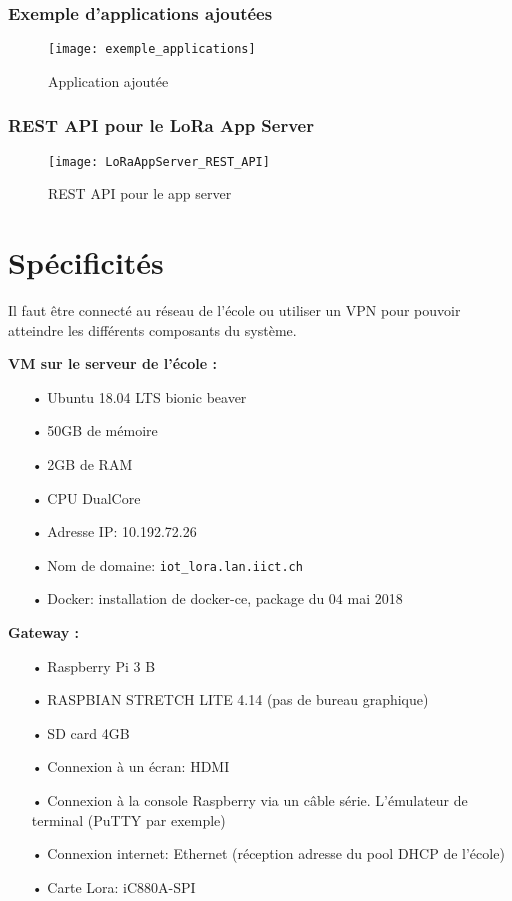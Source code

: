 \subsubsection{Exemple d'applications ajoutées}

\begin{figure}[h!]
\centering
\texttt{[image: exemple\_applications]}
\caption{Application ajoutée}
\end{figure}

\subsubsection{REST API pour le LoRa App Server}

\begin{figure}[h!]
\texttt{[image: LoRaAppServer\_REST\_API]}
\caption{REST API pour le app server}
\end{figure}
\clearpage

\section{Spécificités}

Il faut être connecté au réseau de l'école ou utiliser un VPN pour pouvoir atteindre les différents composants du système.
\vspace{3mm}

\textbf{VM sur le serveur de l'école :}

\begin{itemize}
\item[•] Ubuntu 18.04 LTS bionic beaver
\item[•] 50GB de mémoire
\item[•] 2GB de RAM
\item[•] CPU DualCore
\item[•] Adresse IP: 10.192.72.26
\item[•] Nom de domaine: \texttt{iot\_lora.lan.iict.ch}
\item[•] Docker: installation de docker-ce, package du 04 mai 2018
\end{itemize}
\vspace{3mm}

\textbf{Gateway :}

\begin{itemize}
\item[•] Raspberry Pi 3 B
\item[•] RASPBIAN STRETCH LITE 4.14 (pas de bureau graphique)
\item[•] SD card 4GB
\item[•] Connexion à un écran: HDMI
\item[•] Connexion à la console Raspberry via un câble série. L'émulateur de terminal (PuTTY par exemple)
\item[•] Connexion internet: Ethernet (réception adresse du pool DHCP de l'école)
\item[•] Carte Lora: iC880A-SPI
\end{itemize}

